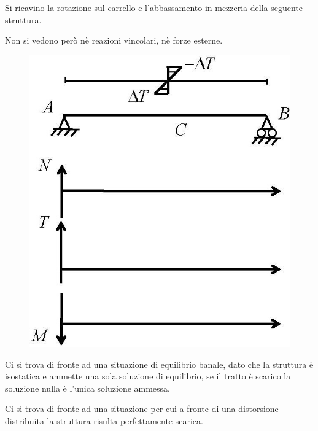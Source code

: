 \documentclass{article}
\begin{document}
\begin{adjustwidth}{2in}{}
		Si ricavino la rotazione sul carrello e
		l’abbassamento in mezzeria della seguente struttura. \newline 
		
		Non si vedono però nè reazioni vincolari, nè forze esterne.
		
\begin{figure}[H]
	\centering
	\includegraphics[width=0.2\linewidth]{"immagini/1.PARTE8_Pagina_17"}
\end{figure}
		Ci si trova di fronte ad una situazione di equilibrio banale, dato che la struttura è isostatica e ammette una sola soluzione di equilibrio, se il tratto è scarico la soluzione nulla è l'unica soluzione ammessa. \newline 
		
		Ci si trova di fronte ad una situazione per cui a fronte di una distorsione distribuita la struttura risulta perfettamente scarica. \newline 
		

\end{adjustwidth}
\end{document}
